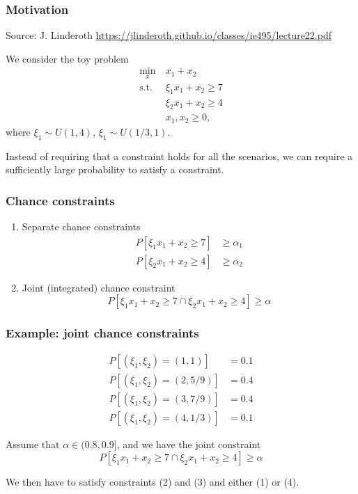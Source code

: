 \documentclass{beamer}
\begin{document}
\begin{frame}
\frametitle{Motivation}

Source: J. Linderoth \url{https://jlinderoth.github.io/classes/ie495/lecture22.pdf}

We consider the toy problem
\begin{align*}
\min_x\ & x_1 + x_2 \\
\mbox{s.t. } & \xi_1 x_1 + x_2 \geq 7 \\
& \xi_2 x_1 + x_2 \geq 4 \\
& x_1, x_2 \geq 0,
\end{align*}
where $\xi_1 \sim U(1,4)$, $\xi_1 \sim U(1/3,1)$.

\mbox{} 

Instead of requiring that a constraint holds for all the scenarios, we can require a sufficiently large probability to satisfy a constraint.

\end{frame}

\begin{frame}
\frametitle{Chance constraints}

\begin{enumerate}
\item 
Separate chance constraints
\begin{align*}
P [ \xi_1x_1 + x_2 \geq 7 ] &\geq \alpha_1 \\
P [ \xi_2x_1 + x_2 \geq 4 ] &\geq \alpha_2
\end{align*}
\item
Joint (integrated) chance constraint
\[
P [ \xi_1x_1 + x_2 \geq 7 \cap \xi_2x_1 + x_2 \geq 4 ] \geq \alpha
\]
\end{enumerate}

\end{frame}

\begin{frame}
\frametitle{Example: joint chance constraints}

\begin{align}
P[(\xi_1, \xi_2) = (1,1)] &= 0.1 \\
P[(\xi_1, \xi_2) = (2,5/9)] &= 0.4 \\
P[(\xi_1, \xi_2) = (3,7/9)] &= 0.4 \\
P[(\xi_1, \xi_2) = (4,1/3)] &= 0.1
\end{align}

\mbox{}

Assume that $\alpha \in (0.8,0.9]$, and we have the joint constraint
\[
P [ \xi_1x_1 + x_2 \geq 7 \cap \xi_2x_1 + x_2 \geq 4 ] \geq \alpha
\]

\mbox{}

We then have to satisfy constraints (2) and (3) and either (1) or (4).

\end{frame}
\end{document}
